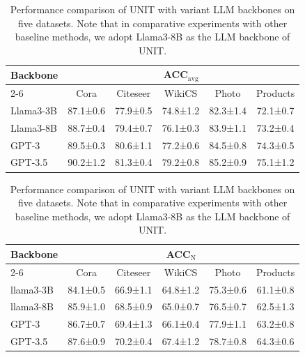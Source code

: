 \documentclass[sigconf]{acmart}
\begin{document}
\begin{table}[]
\setlength{\tabcolsep}{4.4pt}
\caption{Performance comparison of UNIT with variant LLM backbones on five datasets.
Note that in comparative experiments with other baseline methods, we adopt Llama3-8B as the LLM backbone of UNIT.
}
\begin{tabular}{lccccc}
\toprule
\multirow{2}{*}{Backbone} & \multicolumn{5}{c}{ACC$_\text{avg}$}                                            \\ \cmidrule{2-6} 
                         & Cora                & Citeseer                & WikiCS & Photo     &   Products              \\ \midrule
Llama3-3B       & 87.1±0.6          & 77.9±0.5           & 74.8±1.2    &  82.3±1.4        & 72.1±0.7\\
Llama3-8B       & 88.7±0.4          & 79.4±0.7           & 76.1±0.3    &  83.9±1.1        & 73.2±0.4      \\
GPT-3           & 89.5±0.3          & 80.6±1.1           & 77.2±0.6    &  84.5±0.8        & 74.3±0.5 \\
GPT-3.5       & 90.2±1.2          & 81.3±0.4           & 79.2±0.8    &  85.2±0.9        & 75.1±1.2      \\ 
\end{tabular}

\begin{tabular}{lccccc}
\toprule
\multirow{2}{*}{Backbone} & \multicolumn{5}{c}{ACC$_\text{N}$}                                           \\ \cmidrule{2-6} 
                         & Cora                & Citeseer                & WikiCS & Photo     &   Products              \\ \midrule
llama3-3B       & 84.1±0.5          & 66.9±1.1           & 64.8±1.2    &  75.3±0.6        & 61.1±0.8\\
llama3-8B       & 85.9±1.0          & 68.5±0.9          & 65.0±0.7     &  76.5±0.7        & 62.5±1.3      \\
GPT-3           & 86.7±0.7          & 69.4±1.3           & 66.1±0.4    &  77.9±1.1        & 63.2±0.8 \\
GPT-3.5       & 87.6±0.9          & 70.2±0.4           & 67.4±1.2    &  78.7±0.8        & 64.3±0.6      \\ \bottomrule
\end{tabular}
\label{backbone}
\end{table}
\end{document}
